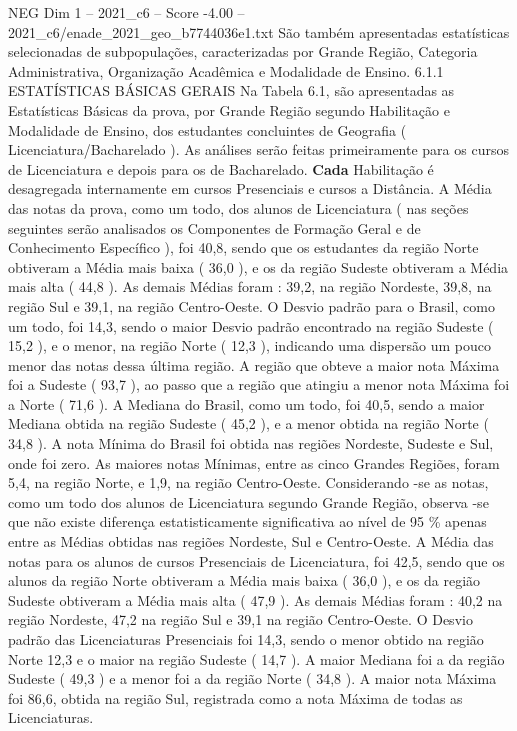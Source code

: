 \begin{textsample}{NEG Dim 1 – 2021\_c6 – Score -4.00 – 2021\_c6/enade\_2021\_geo\_b7744036e1.txt}
São também apresentadas estatísticas selecionadas de subpopulações, caracterizadas por Grande Região, Categoria Administrativa, Organização Acadêmica e Modalidade de Ensino. 6.1.1 ESTATÍSTICAS BÁSICAS GERAIS Na Tabela 6.1, são apresentadas as Estatísticas Básicas da prova, por Grande Região segundo Habilitação e Modalidade de Ensino, dos estudantes concluintes de Geografia ( Licenciatura/Bacharelado ).
As análises serão feitas primeiramente para os cursos de Licenciatura e depois para os de Bacharelado. \textbf{Cada} Habilitação é desagregada internamente em cursos Presenciais e cursos a Distância.
A Média das notas da prova, como um todo, dos alunos de Licenciatura ( nas seções seguintes serão analisados os Componentes de Formação Geral e de Conhecimento Específico ), foi 40,8, sendo que os estudantes da região Norte obtiveram a Média mais baixa ( 36,0 ), e os da região Sudeste obtiveram a Média mais alta ( 44,8 ).
As demais Médias foram : 39,2, na região Nordeste, 39,8, na região Sul e 39,1, na região Centro-Oeste.
O Desvio padrão para o Brasil, como um todo, foi 14,3, sendo o maior Desvio padrão encontrado na região Sudeste ( 15,2 ), e o menor, na região Norte ( 12,3 ), indicando uma dispersão um pouco menor das notas dessa última região.
A região que obteve a maior nota Máxima foi a Sudeste ( 93,7 ), ao passo que a região que atingiu a menor nota Máxima foi a Norte ( 71,6 ).
A Mediana do Brasil, como um todo, foi 40,5, sendo a maior Mediana obtida na região Sudeste ( 45,2 ), e a menor obtida na região Norte ( 34,8 ).
A nota Mínima do Brasil foi obtida nas regiões Nordeste, Sudeste e Sul, onde foi zero.
As maiores notas Mínimas, entre as cinco Grandes Regiões, foram 5,4, na região Norte, e 1,9, na região Centro-Oeste.
Considerando -se as notas, como um todo dos alunos de Licenciatura segundo Grande Região, observa -se que não existe diferença estatisticamente significativa ao nível de 95 \% apenas entre as Médias obtidas nas regiões Nordeste, Sul e Centro-Oeste.
A Média das notas para os alunos de cursos Presenciais de Licenciatura, foi 42,5, sendo que os alunos da região Norte obtiveram a Média mais baixa ( 36,0 ), e os da região Sudeste obtiveram a Média mais alta ( 47,9 ).
As demais Médias foram : 40,2 na região Nordeste, 47,2 na região Sul e 39,1 na região Centro-Oeste.
O Desvio padrão das Licenciaturas Presenciais foi 14,3, sendo o menor obtido na região Norte 12,3 e o maior na região Sudeste ( 14,7 ).
A maior Mediana foi a da região Sudeste ( 49,3 ) e a menor foi a da região Norte ( 34,8 ).
A maior nota Máxima foi 86,6, obtida na região Sul, registrada como a nota Máxima de todas as Licenciaturas.

\end{textsample}
